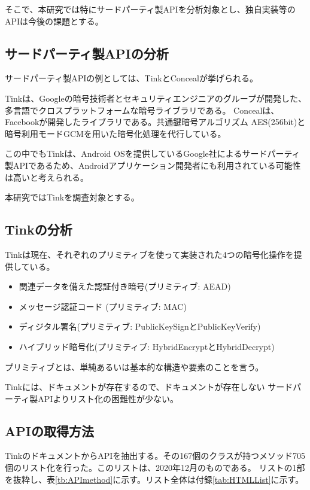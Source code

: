 そこで、本研究では特にサードパーティ製APIを分析対象とし、独自実装等のAPIは今後の課題とする。

\subsection{サードパーティ製APIの分析}

\label{sec:third_party}
サードパーティ製APIの例としては、Tink\cite{tink}とConceal\cite{conceal}が挙げられる。

Tinkは、Googleの暗号技術者とセキュリティエンジニアのグループが開発した、
多言語でクロスプラットフォームな暗号ライブラリである。
Concealは、Facebookが開発したライブラリである。共通鍵暗号アルゴリズム AES(256bit)と暗号利用モードGCMを用いた暗号化処理を代行している。
 
この中でもTinkは、Android OSを提供しているGoogle社によるサードパーティ製APIであるため、Androidアプリケーション開発者にも利用されている可能性は高いと考えられる。

本研究ではTinkを調査対象とする。

\subsection{Tinkの分析}

Tinkは現在、それぞれのプリミティブを使って実装された4つの暗号化操作を提供している。
\begin{itemize}
\item 関連データを備えた認証付き暗号(プリミティブ: AEAD)
\item メッセージ認証コード (プリミティブ: MAC)
\item ディジタル署名(プリミティブ: PublicKeySignとPublicKeyVerify)
\item ハイブリッド暗号化(プリミティブ: HybridEncryptとHybridDecrypt)
\end{itemize}

プリミティブとは、単純あるいは基本的な構造や要素のことを言う。

Tinkには、ドキュメントが存在するので、ドキュメントが存在しない
サードパーティ製APIよりリスト化の困難性が少ない。


\subsection{APIの取得方法}
\label{sec:APIの取得方法}
Tinkのドキュメント\cite{Tink Cryptography}からAPIを抽出する。その167個のクラスが持つメソッド705個のリスト化を行った。このリストは、2020年12月のものである。
リストの1部を抜粋し、表\ref{tb:APImethod}に示す。リスト全体は付録\ref{tab:HTMLList}に示す。

